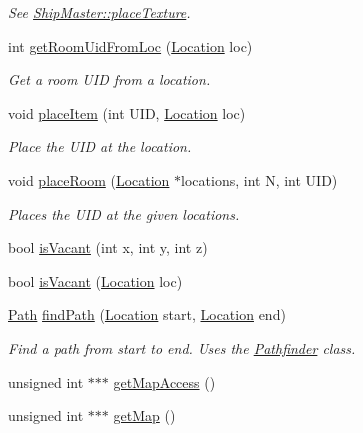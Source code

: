 \begin{DoxyCompactItemize}
\begin{DoxyCompactList}\small\item\em See \hyperlink{classShipMaster_ae90bf5dd5fa1cbf24a4ddbd7b84e3446}{Ship\-Master\-::place\-Texture}. \end{DoxyCompactList}\item 
int \hyperlink{classShipMap_ae3df616ce12eb77874e27ae82331e131}{get\-Room\-Uid\-From\-Loc} (\hyperlink{structLocation}{Location} loc)
\begin{DoxyCompactList}\small\item\em Get a room U\-I\-D from a location. \end{DoxyCompactList}\item 
void \hyperlink{classShipMap_a7d2147c38abb30590644e2dbc3af94ea}{place\-Item} (int U\-I\-D, \hyperlink{structLocation}{Location} loc)
\begin{DoxyCompactList}\small\item\em Place the U\-I\-D at the location. \end{DoxyCompactList}\item 
void \hyperlink{classShipMap_aa9c0f0f672b58f5ce32e2052432d5145}{place\-Room} (\hyperlink{structLocation}{Location} $\ast$locations, int N, int U\-I\-D)
\begin{DoxyCompactList}\small\item\em Places the U\-I\-D at the given locations. \end{DoxyCompactList}\item 
bool \hyperlink{classShipMap_af80dd87cdd6c203a0870c3cbdb498418}{is\-Vacant} (int x, int y, int z)
\item 
bool \hyperlink{classShipMap_a0c89267eede90614d46a33cd7129b1d0}{is\-Vacant} (\hyperlink{structLocation}{Location} loc)
\item 
\hyperlink{classPath}{Path} \hyperlink{classShipMap_ac66dd983ca92d5e3d0696f2a25da90e1}{find\-Path} (\hyperlink{structLocation}{Location} start, \hyperlink{structLocation}{Location} end)
\begin{DoxyCompactList}\small\item\em Find a path from start to end. Uses the \hyperlink{classPathfinder}{Pathfinder} class. \end{DoxyCompactList}\item 
unsigned int $\ast$$\ast$$\ast$ \hyperlink{classShipMap_a2281c139f8f1d4a9023cbfc7a8ebc5f9}{get\-Map\-Access} ()
\item 
unsigned int $\ast$$\ast$$\ast$ \hyperlink{classShipMap_abde984e7f9b9172965e58157981857ae}{get\-Map} ()

\end{DoxyCompactItemize}
